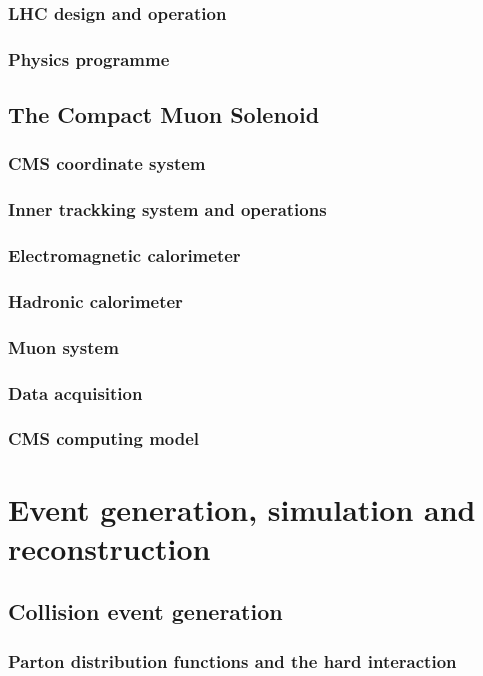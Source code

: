 \subsection{LHC design and operation}
\subsection{Physics programme}
\section[CMS]{The Compact Muon Solenoid}
\subsection{CMS coordinate system}
\subsection{Inner trackking system and operations}
\subsection{Electromagnetic calorimeter}
\subsection{Hadronic calorimeter}
\subsection{Muon system}
\subsection{Data acquisition}
\subsection{CMS computing model}
\chapter[Event]{Event generation, simulation and reconstruction}
\section[Generation]{Collision event generation}
\subsection{Parton distribution functions and the hard interaction}
